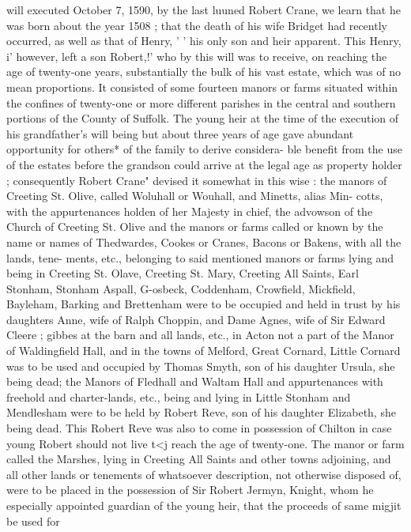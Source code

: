 \documentclass{book}
\begin{document}
will executed October 7, 1590, by the last luuned Robert Crane, 
we learn that he was born about the year 1508 ; that the death of 
his wife Bridget had recently occurred, as well as that of Henry, ' ' 
his only son and heir apparent. This Henry, i' however, left a 
son Robert,!' who by this will was to receive, on reaching the age 
of twenty-one years, substantially the bulk of his vast estate, 
which was of no mean proportions. It consisted of some fourteen 
manors or farms situated within the confines of twenty-one or 
more different parishes in the central and southern portions of the 
County of Suffolk. The young heir at the time of the execution 
of his grandfather's will being but about three years of age gave 
abundant opportunity for others* of the family to derive considera- 
ble benefit from the use of the estates before the grandson could 
arrive at the legal age as property holder ; consequently Robert 
Crane" devised it somewhat in this wise : the manors of Creeting 
St. Olive, called Woluhall or Wouhall, and Minetts, alias Min- 
cotts, with the appurtenances holden of her Majesty in chief, the 
advowson of the Church of Creeting St. Olive and the manors or 
farms called or known by the name or names of Thedwardes, 
Cookes or Cranes, Bacons or Bakens, with all the lands, tene- 
ments, etc., belonging to said mentioned manors or farms lying 
and being in Creeting St. Olave, Creeting St. Mary, Creeting All 
Saints, Earl Stonham, Stonham Aspall, G-osbeck, Coddenham, 
Crowfield, Mickfield, Bayleham, Barking and Brettenham were to 
be occupied and held in trust by his daughters Anne, wife of 
Ralph Choppin, and Dame Agnes, wife of Sir Edward Cleere ; 
gibbes at the barn and all lands, etc., in Acton not a part of the 
Manor of Waldingfield Hall, and in the towns of Melford, Great 
Cornard, Little Cornard was to be used and occupied by Thomas 
Smyth, son of his daughter Ursula, she being dead; the Manors 
of Fledhall and Waltam Hall and appurtenances with freehold 
and charter-lands, etc., being and lying in Little Stonham and 
Mendlesham were to be held by Robert Reve, son of his daughter 
Elizabeth, she being dead. This Robert Reve was also to come 
in possession of Chilton in case young Robert should not live t<j 
reach the age of twenty-one. The manor or farm called the 
Marshes, lying in Creeting All Saints and other towns adjoining, 
and all other lands or tenements of whatsoever description, not 
otherwise disposed of, were to be placed in the possession of Sir 
Robert Jermyn, Knight, whom he especially appointed guardian 
of the young heir, that the proceeds of same migjit be used for 
\end{document}
